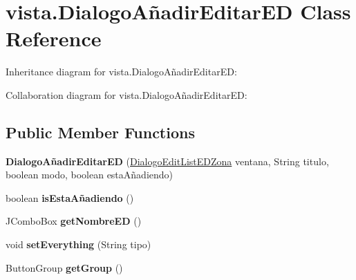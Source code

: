 \hypertarget{classvista_1_1_dialogo_a_xC3_xB1adir_editar_e_d}{}\section{vista.\+Dialogo\+Añadir\+Editar\+ED Class Reference}
\label{classvista_1_1_dialogo_a_xC3_xB1adir_editar_e_d}


Inheritance diagram for vista.\+Dialogo\+Añadir\+Editar\+ED\+:


Collaboration diagram for vista.\+Dialogo\+Añadir\+Editar\+ED\+:
\subsection*{Public Member Functions}
\begin{DoxyCompactItemize}
\item 
\mbox{\label{classvista_1_1_dialogo_a_xC3_xB1adir_editar_e_d_a6eee77dd9a1cefe1069f58a427ea720e}} 
{\bfseries Dialogo\+Añadir\+Editar\+ED} (\mbox{\hyperlink{classvista_1_1_dialogo_edit_list_e_d_zona}{Dialogo\+Edit\+List\+E\+D\+Zona}} ventana, String titulo, boolean modo, boolean esta\+Añadiendo)
\item 
\mbox{\label{classvista_1_1_dialogo_a_xC3_xB1adir_editar_e_d_a8fc12de0e1c8f392d5bfb9c536b08681}} 
boolean {\bfseries is\+Esta\+Añadiendo} ()
\item 
\mbox{\label{classvista_1_1_dialogo_a_xC3_xB1adir_editar_e_d_a07093fd106d820f76588c874aba95cc1}} 
J\+Combo\+Box {\bfseries get\+Nombre\+ED} ()
\item 
\mbox{\label{classvista_1_1_dialogo_a_xC3_xB1adir_editar_e_d_a117c2dfd237e5bc25fc4e49f531dcaab}} 
void {\bfseries set\+Everything} (String tipo)
\item 
\mbox{\label{classvista_1_1_dialogo_a_xC3_xB1adir_editar_e_d_a8da67d26b1a48c253fdc8c7bd4424d74}} 
Button\+Group {\bfseries get\+Group} ()
\item 
\mbox{\label{classvista_1_1_dialogo_a_xC3_xB1adir_editar_e_d_a57e203c700fd371e0bebd55c8b347c07}} 

\end{DoxyCompactItemize}
